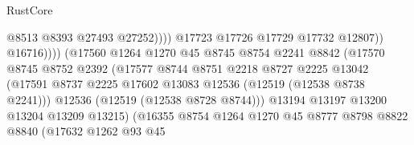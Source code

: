 \begin{lexlean}{RustCore}
\begin{coremodule}
                                                    @8513
                                                    @8393
                                                    @27493
                                                    @27252))))
                                            @17723
                                            @17726
                                            @17729
                                            @17732
                                            @12807))
                                        @16716))))
                                (@17560
                                  @1264
                                  @1270
                                  @45
                                  @8745
                                  @8754
                                  @2241
                                  @8842
                                  (@17570
                                    @8745
                                    @8752
                                    @2392
                                    (@17577
                                      @8744
                                      @8751
                                      @2218
                                      @8727
                                      @2225
                                      @13042
                                      (@17591
                                        @8737
                                        @2225
                                        @17602
                                        @13083
                                        @12536
                                        (@12519 (@12538 @8738 @2241)))
                                      @12536
                                      (@12519 (@12538 @8728 @8744)))
                                    @13194
                                    @13197
                                    @13200
                                    @13204
                                    @13209
                                    @13215)
                                  (@16355
                                    @8754
                                    @1264
                                    @1270
                                    @45
                                    @8777
                                    @8798
                                    @8822
                                    @8840
                                    (@17632
                                      @1262
                                      @93
                                      @45

\end{coremodule}
\end{lexlean}
